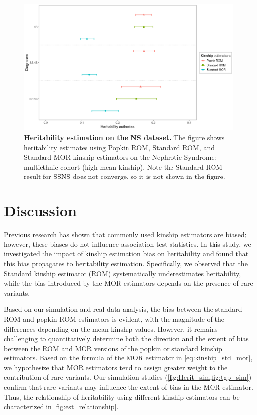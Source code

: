 \documentclass[11pt]{article}
\begin{document}
\begin{figure}[bp!]
  \centering
  \includegraphics[width=\textwidth]{data/Fig2_NS_sex_array.png}
  \caption{
    {\bf Heritability estimation on the NS dataset.}
    The figure shows heritability estimates using Popkin ROM, Standard ROM, and Standard MOR kinship estimators on the Nephrotic Syndrome: multiethnic cohort (high mean kinship). Note the Standard ROM result for SSNS does not converge, so it is not shown in the figure.
    }
  \label{fig:NS}
\end{figure}



\section{Discussion}

Previous research has shown that commonly used kinship estimators are biased; however, these biases do not influence association test statistics. In this study, we investigated the impact of kinship estimation bias on heritability and found that this bias propagates to heritability estimation. Specifically, we observed that the Standard kinship estimator (ROM) systematically underestimates heritability, while the bias introduced by the MOR estimators depends on the presence of rare variants.



Based on our simulation and real data analysis, the bias between the standard ROM and popkin ROM estimators is evident, with the magnitude of the differences depending on the mean kinship values. However, it remains challenging to quantitatively determine both the direction and the extent of bias between the ROM and MOR versions of the popkin or standard kinship estimators. Based on the formula of the MOR estimator in \cref{eq:kinship_std_mor}, we hypothesize that MOR estimators tend to assign greater weight to the contribution of rare variants. Our simulation studies (\cref{fig:Herit_sim,fig:tgp_sim}) confirm that rare variants may influence the extent of bias in the MOR estimator. Thus, the relationship of heritability using different kinship estimators can be characterized in \cref{fig:est_relationship}.
\end{document}
